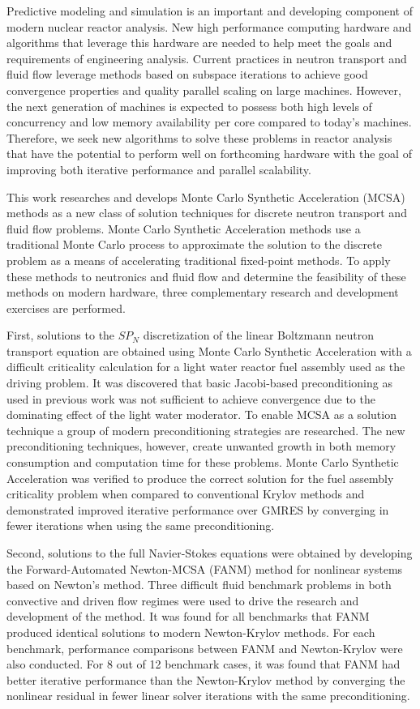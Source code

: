 Predictive modeling and simulation is an important and developing
component of modern nuclear reactor analysis. New high performance
computing hardware and algorithms that leverage this hardware are
needed to help meet the goals and requirements of engineering
analysis. Current practices in neutron transport and fluid flow
leverage methods based on subspace iterations to achieve good
convergence properties and quality parallel scaling on large
machines. However, the next generation of machines is expected to
possess both high levels of concurrency and low memory availability
per core compared to today's machines. Therefore, we seek new
algorithms to solve these problems in reactor analysis that have the
potential to perform well on forthcoming hardware with the goal of
improving both iterative performance and parallel scalability.

This work researches and develops Monte Carlo Synthetic Acceleration
(MCSA) methods as a new class of solution techniques for discrete
neutron transport and fluid flow problems. Monte Carlo Synthetic
Acceleration methods use a traditional Monte Carlo process to
approximate the solution to the discrete problem as a means of
accelerating traditional fixed-point methods. To apply these methods
to neutronics and fluid flow and determine the feasibility of these
methods on modern hardware, three complementary research and
development exercises are performed.

First, solutions to the $SP_N$ discretization of the linear Boltzmann
neutron transport equation are obtained using Monte Carlo Synthetic
Acceleration with a difficult criticality calculation for a light
water reactor fuel assembly used as the driving problem. It was
discovered that basic Jacobi-based preconditioning as used in previous
work was not sufficient to achieve convergence due to the dominating
effect of the light water moderator. To enable MCSA as a solution
technique a group of modern preconditioning strategies are
researched. The new preconditioning techniques, however, create
unwanted growth in both memory consumption and computation time for
these problems. Monte Carlo Synthetic Acceleration was verified to
produce the correct solution for the fuel assembly criticality problem
when compared to conventional Krylov methods and demonstrated improved
iterative performance over GMRES by converging in fewer iterations
when using the same preconditioning.

Second, solutions to the full Navier-Stokes equations were obtained by
developing the Forward-Automated Newton-MCSA (FANM) method for
nonlinear systems based on Newton's method. Three difficult fluid
benchmark problems in both convective and driven flow regimes were
used to drive the research and development of the method. It was found
for all benchmarks that FANM produced identical solutions to modern
Newton-Krylov methods. For each benchmark, performance comparisons
between FANM and Newton-Krylov were also conducted. For 8 out of 12
benchmark cases, it was found that FANM had better iterative
performance than the Newton-Krylov method by converging the nonlinear
residual in fewer linear solver iterations with the same
preconditioning.

